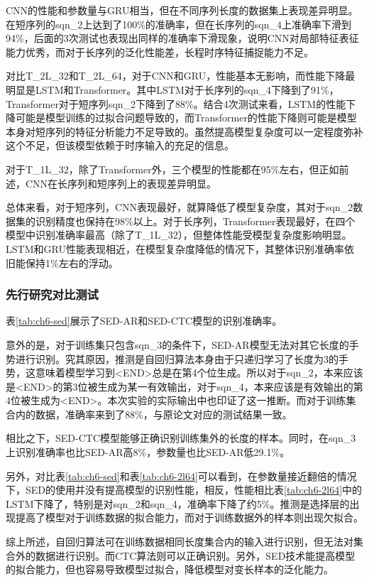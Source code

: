 CNN的性能和参数量与GRU相当，但在不同序列长度的数据集上表现差异明显。在短序列的sqn\_2上达到了100\%的准确率，但在长序列的sqn\_4上准确率下滑到94\%，后面的3次测试也表现出同样的准确率下滑现象，说明CNN对局部特征表征能力优秀，而对于长序列的泛化性能差，长程时序特征捕捉能力不足。

对比T\_2L\_32和T\_2L\_64，对于CNN和GRU，性能基本无影响，而性能下降最明显是LSTM和Transformer。其中LSTM对于长序列的sqn\_4下降到了91\%，Transformer对于短序列sqn\_2下降到了88\%。结合4次测试来看，LSTM的性能下降可能是模型训练的过拟合问题导致的，而Transformer的性能下降则可能是模型本身对短序列的特征分析能力不足导致的。虽然提高模型复杂度可以一定程度弥补这个不足，但该模型依赖于时序输入的充足的信息。

对于T\_1L\_32，除了Transformer外，三个模型的性能都在95\%左右，但正如前述，CNN在长序列和短序列上的表现差异明显。

总体来看，对于短序列，CNN表现最好，就算降低了模型复杂度，其对于sqn\_2数据集的识别精度也保持在98\%以上。对于长序列，Transformer表现最好，在四个模型中识别准确率最高（除了T\_1L\_32），但整体性能受模型复杂度影响明显。LSTM和GRU性能表现相近，在模型复杂度降低的情况下，其整体识别准确率依旧能保持1\%左右的浮动。

\subsubsection{先行研究对比测试}

表\ref{tab:ch6-sed}展示了SED-AR和SED-CTC模型的识别准确率。

意外的是，对于训练集只包含sqn\_3的条件下，SED-AR模型无法对其它长度的手势进行识别。究其原因，推测是自回归算法本身由于只递归学习了长度为3的手势，这意味着模型学习到<END>总是在第4个位生成。所以对于sqn\_2，本来应该是<END>的第3位被生成为某一有效输出，对于sqn\_4，本来应该是有效输出的第4位被生成为<END>。本次实验的实际输出中也印证了这一推断。而对于训练集合内的数据，准确率来到了88\%，与原论文对应的测试结果一致。

相比之下，SED-CTC模型能够正确识别训练集外的长度的样本。同时，在sqn\_3上识别准确率也比SED-AR高8\%，参数量也比SED-AR低29.1\%。

另外，对比表\ref{tab:ch6-sed}和表\ref{tab:ch6-2l64}可以看到，在参数量接近翻倍的情况下，SED的使用并没有提高模型的识别性能，相反，性能相比表\ref{tab:ch6-2l64}中的LSTM下降了，特别是对sqn\_2和sqn\_4，准确率下降了约5\%。推测是选择层的出现提高了模型对于训练数据的拟合能力，而对于训练数据外的样本则出现欠拟合。

综上所述，自回归算法可在训练数据相同长度集合内的输入进行识别，但无法对集合外的数据进行识别。而CTC算法则可以正确识别。另外，SED技术能提高模型的拟合能力，但也容易导致模型过拟合，降低模型对变长样本的泛化能力。

